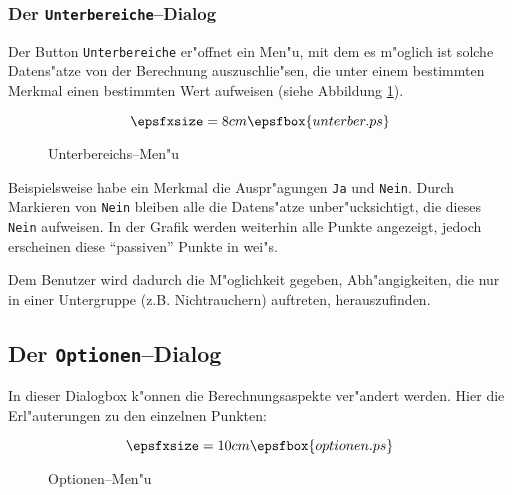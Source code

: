 \subsubsection*{Der {\tt Unterbereiche}--Dialog}
Der Button \verb-Unterbereiche-  er"offnet ein Men"u, mit dem es m"oglich ist
solche Datens"atze von der Berechnung auszuschlie"sen, die unter einem 
bestimmten
Merkmal einen bestimmten Wert aufweisen (siehe Abbildung \ref{unterber}).
\begin{figure}[htp]
	\[ \epsfxsize=8cm \epsfbox{unterber.ps} \]
	\caption{\label{unterber} Unterbereichs--Men"u}
\end{figure}

Beispielsweise habe ein Merkmal die Auspr"agungen \verb-Ja- und 
\verb-Nein-. Durch Markieren von \verb-Nein- bleiben alle
die Datens"atze unber"ucksichtigt, die dieses \verb-Nein-
aufweisen.
In der Grafik werden weiterhin alle Punkte angezeigt, jedoch
erscheinen diese "`passiven"' Punkte in wei"s.

Dem Benutzer wird dadurch die M"oglichkeit gegeben, Abh"angigkeiten, 
die nur in einer Untergruppe (z.B. Nichtrauchern) auftreten, 
herauszufinden.

\subsection*{Der {\tt Optionen}--Dialog}
In dieser Dialogbox k"onnen die Berechnungsaspekte ver"andert werden.
Hier die Erl"auterungen zu den einzelnen Punkten:
\begin{figure}[htp]
	\[ \epsfxsize=10cm \epsfbox{optionen.ps} \]
	\caption{Optionen--Men"u}
\end{figure}

